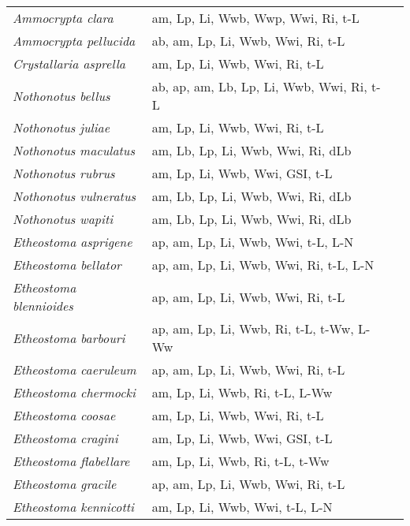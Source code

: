 {\begin{longtable}[c]{p{3.5cm}p{5.5cm}p{5.5cm}}
\emph{Ammocrypta clara} &  am, Lp, Li, Wwb, Wwp, Wwi, Ri, t-L & \citet{DrakPowe2008} \\
\emph{Ammocrypta pellucida} &  ab, am, Lp, Li, Wwb, Wwi, Ri, t-L & \citet{WallYeag1990,DrakPowe2008} \\
\emph{Crystallaria asprella} &  am, Lp, Li, Wwb, Wwi, Ri, t-L & \citet{GeorSlac1996} \\
\emph{Nothonotus bellus} &  ab, ap, am, Lb, Lp, Li, Wwb, Wwi, Ri, t-L & \citet{Fisc1990} \\
\emph{Nothonotus juliae} &  am, Lp, Li, Wwb, Wwi, Ri, t-L & \citet{JameTabe1986} \\
\emph{Nothonotus maculatus} &  am, Lb, Lp, Li, Wwb, Wwi, Ri, dLb & \citet{RublRake2016,PageBurr1991} \\
\emph{Nothonotus rubrus} &  am, Lp, Li, Wwb, Wwi, GSI, t-L & \citet{KnigRoss1992,IrwiFolt2012} \\
\emph{Nothonotus vulneratus} &  am, Lb, Lp, Li, Wwb, Wwi, Ri, dLb & \citet{RublRake2016,PageBurr1991} \\
\emph{Nothonotus wapiti} &  am, Lb, Lp, Li, Wwb, Wwi, Ri, dLb & \citet{RublRake2016,PageBurr1991} \\
\emph{Etheostoma asprigene} &  ap, am, Lp, Li, Wwb, Wwi, t-L, L-N & \citet{CummGrad1984} \\
\emph{Etheostoma bellator} &  ap, am, Lp, Li, Wwb, Wwi, Ri, t-L, L-N & \citet{KhudKuha2007,PageBurr1991} \\
\emph{Etheostoma blennioides} &  ap, am, Lp, Li, Wwb, Wwi, Ri, t-L & \citet{Fahy1954} \\
\emph{Etheostoma barbouri} &  ap, am, Lp, Li, Wwb, Ri, t-L, t-Ww, L-Ww & \citet{Flyn1975} \\
\emph{Etheostoma caeruleum} &  ap, am, Lp, Li, Wwb, Wwi, Ri, t-L & \citet{GradBart1984} \\
\emph{Etheostoma chermocki} &  am, Lp, Li, Wwb, Ri, t-L, L-Ww & \citet{KhudArri2005} \\
\emph{Etheostoma coosae} &  am, Lp, Li, Wwb, Wwi, Ri, t-L & \citet{ONeiDraw1981} \\
\emph{Etheostoma cragini} &  am, Lp, Li, Wwb, Wwi, GSI, t-L & \citet{TabeTabe1986} \\
\emph{Etheostoma flabellare} &  am, Lp, Li, Wwb, Ri, t-L, t-Ww & \citet{Karr1964} \\
\emph{Etheostoma gracile} &  ap, am, Lp, Li, Wwb, Wwi, Ri, t-L & \citet{BraaSmit1967} \\
\emph{Etheostoma kennicotti} &  am, Lp, Li, Wwb, Wwi, t-L, L-N & \citet{Page1975} \\

\end{longtable}}
